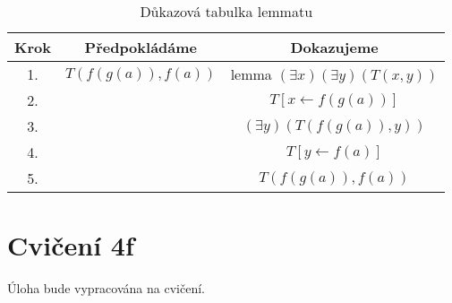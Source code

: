 \documentclass{article}
\begin{document}
\begin{table}[H]\centering

    \caption{Důkazová tabulka lemmatu}

\begin{tabular}{|c|c|c|}
    
    
        \hline \textbf{Krok} & \textbf{Předpokládáme} & \textbf{Dokazujeme} \\ \hline \hline
    	1. &  $T(f(g(a)), f(a))$ & lemma $(\exists x)(\exists y)(T(x,y))$ \\ \hline
    	2. & & $T[x\leftarrow f(g(a))]$ \\ \hline
    	3. & & $(\exists y)(T(f(g(a)),y))$ \\ \hline
    	4. & & $T[y \leftarrow f(a)]$ \\ \hline
    	5. & & $T(f(g(a)), f(a))$ \\ \hline
    	
    	
    	\end{tabular}
\end{table}



\section{Cvičení 4f}
Úloha bude vypracována na cvičení.
\end{document}

